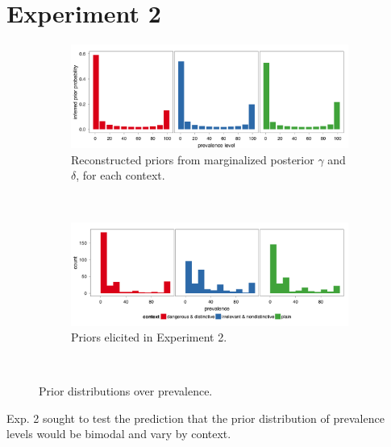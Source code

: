 \documentclass[10pt,letterpaper]{article}
\begin{document}
\section{Experiment 2}

\begin{figure}
        \centering
        \begin{subfigure}[b]{\columnwidth}
    			\includegraphics[width=\columnwidth]{inferred_marginalized_priors}
                \caption{Reconstructed priors from marginalized posterior $\gamma$ and $\delta$, for each context.}
                \label{fig:inferredpriors}
        \end{subfigure}%
        
        ~ %
        
        \begin{subfigure}[b]{\columnwidth}
                \includegraphics[width=\columnwidth]{elicited_priors}
                \caption{Priors elicited in Experiment 2.}
                \label{fig:elicitedpriors}
        \end{subfigure}
        ~ %
        \caption{Prior distributions over prevalence.}\label{fig:priors}
\end{figure}


Exp. 2 sought to test the prediction that the prior distribution of prevalence levels would be bimodal and vary by context.
\end{document}
